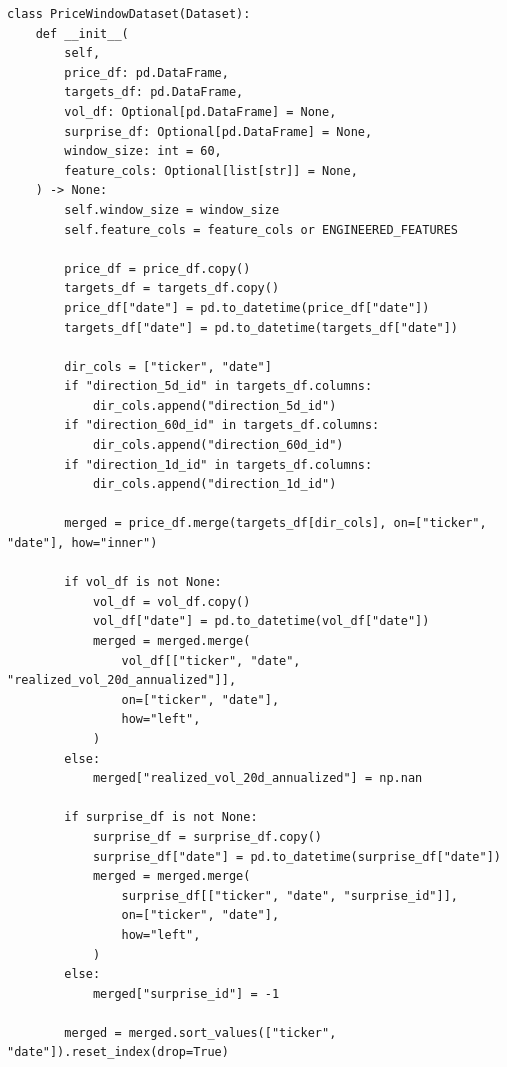 \documentclass[12pt,a4paper]{article}
\begin{document}
\begin{lstlisting}[caption={PriceWindowDataset (src/data/price\_dataset.py)}]
class PriceWindowDataset(Dataset):
    def __init__(
        self,
        price_df: pd.DataFrame,
        targets_df: pd.DataFrame,
        vol_df: Optional[pd.DataFrame] = None,
        surprise_df: Optional[pd.DataFrame] = None,
        window_size: int = 60,
        feature_cols: Optional[list[str]] = None,
    ) -> None:
        self.window_size = window_size
        self.feature_cols = feature_cols or ENGINEERED_FEATURES

        price_df = price_df.copy()
        targets_df = targets_df.copy()
        price_df["date"] = pd.to_datetime(price_df["date"])
        targets_df["date"] = pd.to_datetime(targets_df["date"])

        dir_cols = ["ticker", "date"]
        if "direction_5d_id" in targets_df.columns:
            dir_cols.append("direction_5d_id")
        if "direction_60d_id" in targets_df.columns:
            dir_cols.append("direction_60d_id")
        if "direction_1d_id" in targets_df.columns:
            dir_cols.append("direction_1d_id")

        merged = price_df.merge(targets_df[dir_cols], on=["ticker", "date"], how="inner")

        if vol_df is not None:
            vol_df = vol_df.copy()
            vol_df["date"] = pd.to_datetime(vol_df["date"])
            merged = merged.merge(
                vol_df[["ticker", "date", "realized_vol_20d_annualized"]],
                on=["ticker", "date"],
                how="left",
            )
        else:
            merged["realized_vol_20d_annualized"] = np.nan

        if surprise_df is not None:
            surprise_df = surprise_df.copy()
            surprise_df["date"] = pd.to_datetime(surprise_df["date"])
            merged = merged.merge(
                surprise_df[["ticker", "date", "surprise_id"]],
                on=["ticker", "date"],
                how="left",
            )
        else:
            merged["surprise_id"] = -1

        merged = merged.sort_values(["ticker", "date"]).reset_index(drop=True)


\end{lstlisting}
\end{document}
